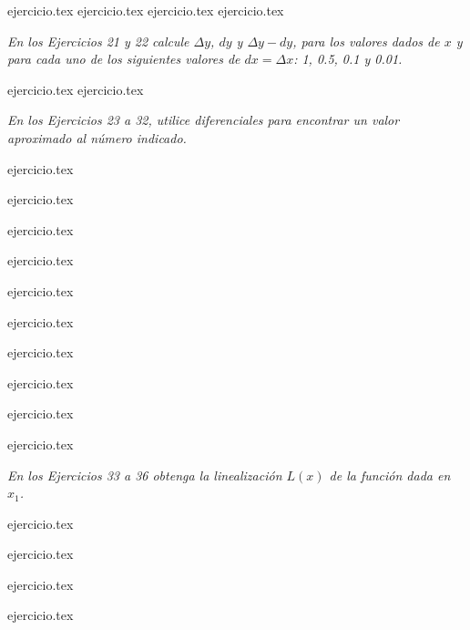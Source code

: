 \begin{enumerate}
    \setcounter{enumi}{16}
    {ejercicio.tex}
    {ejercicio.tex}
    {ejercicio.tex}
    {ejercicio.tex}
\end{enumerate}

\noindent \textit{En los Ejercicios 21 y 22 calcule $\Delta y$, $dy$ y $\Delta y - dy$, para los valores dados de $x$ y para cada uno de los siguientes valores de $dx = \Delta x$: 1, 0.5, 0.1 y 0.01.}

\begin{enumerate}
    \setcounter{enumi}{20}
    {ejercicio.tex}
    {ejercicio.tex}
\end{enumerate}

\noindent \textit{En los Ejercicios 23 a 32, utilice diferenciales para encontrar un valor aproximado al número indicado.}

\begin{enumerate}
    \begin{minipage}{0.45\textwidth}
    \setcounter{enumi}{22}
    {ejercicio.tex}
    \addtocounter{enumi}{1}
    {ejercicio.tex}
    \addtocounter{enumi}{1}
    {ejercicio.tex}
    \addtocounter{enumi}{1}
    {ejercicio.tex}
    \addtocounter{enumi}{1}
    {ejercicio.tex}
    \end{minipage}%
    \begin{minipage}{0.45\textwidth}
    \setcounter{enumi}{23}
    {ejercicio.tex}
    \addtocounter{enumi}{1}
    {ejercicio.tex}
    \addtocounter{enumi}{1}
    {ejercicio.tex}
    \addtocounter{enumi}{1}
    {ejercicio.tex}
    \addtocounter{enumi}{1}
    {ejercicio.tex}
    \end{minipage}
\end{enumerate}

\noindent \textit{En los Ejercicios 33 a 36 obtenga la linealización $L(x)$ de la función dada en $x_1$.}

\begin{enumerate}
    \begin{minipage}{0.45\textwidth}
    \setcounter{enumi}{32}
    {ejercicio.tex}
    \addtocounter{enumi}{1}
    {ejercicio.tex}
    \end{minipage}%
    \begin{minipage}{0.45\textwidth}
    \setcounter{enumi}{33}
    {ejercicio.tex}
    \addtocounter{enumi}{1}
    {ejercicio.tex}
    \end{minipage}
\end{enumerate}

